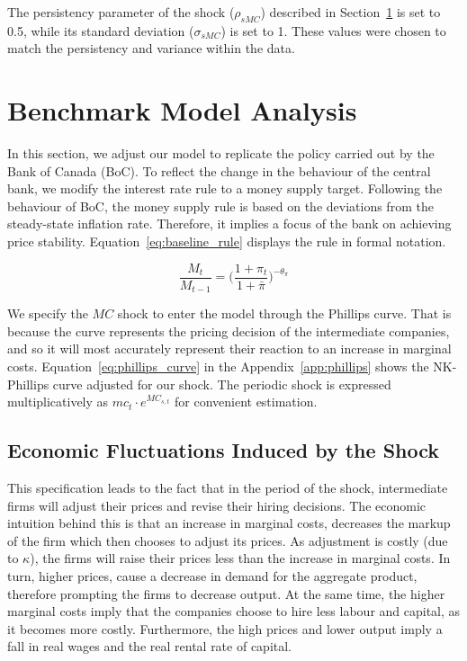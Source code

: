 \documentclass[12pt]{article}
\begin{document}
The persistency parameter of the shock ($\rho_{sMC}$) described in Section~\ref{s:benchmark_model} is set to 0.5, while its standard deviation ($\sigma_{sMC}$) is set to 1. These values were chosen to match the persistency and variance within the data.

\section{Benchmark Model Analysis}\label{s:benchmark_model}

In this section, we adjust our model to replicate the policy carried out by the Bank of Canada (BoC). To reflect the change in the behaviour of the central bank, we modify the interest rate rule to a money supply target. Following the behaviour of BoC, the money supply rule is based on the deviations from the steady-state inflation rate. Therefore, it implies a focus of the bank on achieving price stability. Equation~\ref{eq:baseline_rule} displays the rule in formal notation.


\begin{equation}\label{eq:baseline_rule}
    \frac{M_t}{M_{t-1}} = \Big(\frac{1+\pi_{t}}{1+ \bar \pi}\Big)^{-\theta_{\pi}}
\end{equation}

We specify the $MC$ shock to enter the model through the Phillips curve. That is because the curve represents the pricing decision of the intermediate companies, and so it will most accurately represent their reaction to an increase in marginal costs. Equation~\ref{eq:phillips_curve} in the Appendix~\ref{app:phillips} shows the NK-Phillips curve adjusted for our shock. The periodic shock is expressed multiplicatively as $mc_t \cdot e^{MC_{s, t}}$ for convenient estimation.

\subsection*{Economic Fluctuations Induced by the Shock}

This specification leads to the fact that in the period of the shock, intermediate firms will adjust their prices and revise their hiring decisions. The economic intuition behind this is that an increase in marginal costs, decreases the markup of the firm which then chooses to adjust its prices. As adjustment is costly (due to $\kappa$), the firms will raise their prices less than the increase in marginal costs. In turn, higher prices, cause a decrease in demand for the aggregate product, therefore prompting the firms to decrease output. At the same time, the higher marginal costs imply that the companies choose to hire less labour and capital, as it becomes more costly. Furthermore, the high prices and lower output imply a fall in real wages and the real rental rate of capital.
\end{document}
